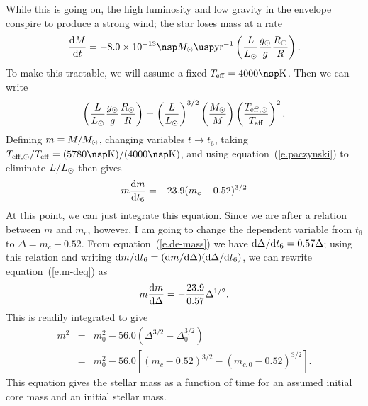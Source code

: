 \documentclass[11pt]{article}
\newcommand{\gsun}{\ensuremath{g_{\odot}}}
\newcommand{\tsix}{\ensuremath{t_{6}}}
\newcommand{\Teffsun}{\ensuremath{T_{\mathrm{eff,\odot}}}}
\begin{document}
While this is going on, the high luminosity and low gravity in the envelope conspire to produce a strong wind; the star loses mass at a rate
\begin{equation}\label{e.mass-loss}
\frac{\dif M}{\dif t} = -8.0\ee{-13}\nsp\Msun\usp\yr^{-1}\left(\frac{L}{\Lsun}\frac{\gsun}{g}\frac{\Rsun}{R}\right).
\end{equation}
To make this tractable, we will assume a fixed $\Teff = 4000\nsp\K$.  Then we can write
\begin{equation}\label{e.r-l}
\left(\frac{L}{\Lsun}\frac{\gsun}{g}\frac{\Rsun}{R}\right) = \left(\frac{L}{\Lsun}\right)^{3/2}\left(\frac{\Msun}{M}\right)\left(\frac{\Teffsun}{\Teff}\right)^{2}.
\end{equation}
Defining $m \equiv M/M_\odot$, changing variables $t\to\tsix$,  taking $\Teffsun/\Teff = (5780\nsp\K)/(4000\nsp\K)$, and using equation~(\ref{e.paczynski}) to eliminate $L/L_{\odot}$ then gives
\begin{equation}\label{e.m-deq}
m\frac{\dif m}{\dif \tsix} = -23.9(m_{c}-0.52)^{3/2}
\end{equation}
At this point, we can just integrate this equation. Since we are after a relation between $m$ and $m_{c}$, however, I am going to change the dependent variable from $\tsix$ to $\Delta = m_{c}-0.52$.  From equation~(\ref{e.de-mass}) we have $\dif\Delta/\dif\tsix = 0.57\Delta$; using this relation and writing $\dif m/\dif\tsix = (\dif m/\dif\Delta)(\dif \Delta/\dif\tsix)$, we can rewrite equation~(\ref{e.m-deq}) as
\begin{equation}\label{e.m-deq2}
m\frac{\mathrm{d} m}{\mathrm{d}\Delta} = -\frac{23.9}{0.57}\Delta^{1/2}. 
\end{equation}
This is readily integrated to give
\begin{eqnarray}
m^{2} &=& m_{0}^{2} - 56.0\left(\Delta^{3/2} - \Delta_{0}^{3/2}\right)\nonumber\\
 &=& m_{0}^{2} - 56.0\left[\left(m_{c}-0.52\right)^{3/2} - \left(m_{c,0}-0.52\right)^{3/2}\right].
\label{e.m-mc}
\end{eqnarray}
This equation gives the stellar mass as a function of time for an assumed initial core mass and an initial stellar mass.
\end{document}
